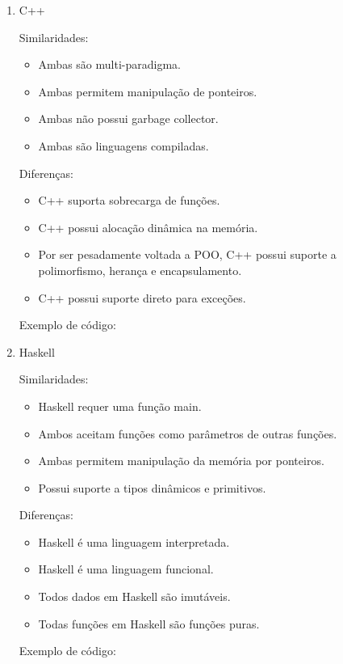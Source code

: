 \begin{enumerate}
    \item C++
        
    Similaridades: 
        \begin{itemize}
            \item Ambas são multi-paradigma.
            \item Ambas permitem manipulação de ponteiros.
            \item Ambas não possui garbage collector.
            \item Ambas são linguagens compiladas.
        \end{itemize}
    Diferenças:
        \begin{itemize}
            \item C++ suporta sobrecarga de funções.
            \item C++ possui alocação dinâmica na memória.
            \item Por ser pesadamente voltada a POO, C++ possui suporte a polimorfismo, herança e encapsulamento.
            \item C++ possui suporte direto para exceções.
        \end{itemize}
    Exemplo de código: 
    
    

    \item Haskell
        
    Similaridades: 
        \begin{itemize}
            \item Haskell requer uma função main.
            \item Ambos aceitam funções como parâmetros de outras funções.
            \item Ambas permitem manipulação da memória por ponteiros.
            \item Possui suporte a tipos dinâmicos e primitivos.
        \end{itemize}
    Diferenças:
        \begin{itemize}
            \item Haskell é uma linguagem interpretada.
            \item Haskell é uma linguagem funcional.
            \item Todos dados em Haskell são imutáveis.
            \item Todas funções em Haskell são funções puras.
        \end{itemize}
    Exemplo de código: 

        
\end{enumerate}

\newpage